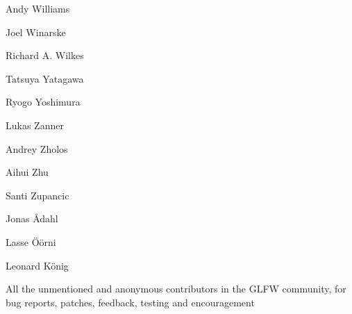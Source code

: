 \begin{DoxyItemize}
\item Andy Williams
\item Joel Winarske
\item Richard A. Wilkes
\item Tatsuya Yatagawa
\item Ryogo Yoshimura
\item Lukas Zanner
\item Andrey Zholos
\item Aihui Zhu
\item Santi Zupancic
\item Jonas Ådahl
\item Lasse Öörni
\item Leonard König
\item All the unmentioned and anonymous contributors in the G\+L\+FW community, for bug reports, patches, feedback, testing and encouragement 
\end{DoxyItemize}